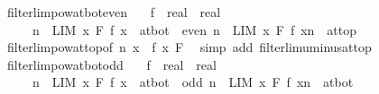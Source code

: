 \begin{isabellebody}
\isamarkupfalse%
%
\endisatagproof
{\isafoldproof}%
%
\isadelimproof
\isanewline
%
\endisadelimproof
\isanewline
{}\isamarkupfalse%
\ filterlim{\isacharunderscore}{\kern0pt}pow{\isacharunderscore}{\kern0pt}at{\isacharunderscore}{\kern0pt}bot{\isacharunderscore}{\kern0pt}even{\isacharcolon}{\kern0pt}\isanewline
\ \ \ f\ {\isacharcolon}{\kern0pt}{\isacharcolon}{\kern0pt}\ {\isachardoublequoteopen}real\ {\isasymRightarrow}\ real{\isachardoublequoteclose}\isanewline
\ \ \ {\isachardoublequoteopen}{}\ {\isacharless}{\kern0pt}\ n\ {\isasymLongrightarrow}\ LIM\ x\ F{\isachardot}{\kern0pt}\ f\ x\ {\isacharcolon}{\kern0pt}{\isachargreater}{\kern0pt}\ at{\isacharunderscore}{\kern0pt}bot\ {\isasymLongrightarrow}\ even\ n\ {\isasymLongrightarrow}\ LIM\ x\ F{\isachardot}{\kern0pt}\ {\isacharparenleft}{\kern0pt}f\ x{\isacharparenright}{\kern0pt}{\isacharcircum}{\kern0pt}n\ {\isacharcolon}{\kern0pt}{\isachargreater}{\kern0pt}\ at{\isacharunderscore}{\kern0pt}top{\isachardoublequoteclose}\isanewline
%
\isadelimproof
\ \ %
\endisadelimproof
%
\isatagproof
{}\isamarkupfalse%
\ filterlim{\isacharunderscore}{\kern0pt}pow{\isacharunderscore}{\kern0pt}at{\isacharunderscore}{\kern0pt}top{\isacharbrackleft}{\kern0pt}of\ n\ {\isachardoublequoteopen}{\isasymlambda}x{\isachardot}{\kern0pt}\ {\isacharminus}{\kern0pt}\ f\ x{\isachardoublequoteclose}\ F{\isacharbrackright}{\kern0pt}\ \isamarkupfalse%
\ {\isacharparenleft}{\kern0pt}simp\ add{\isacharcolon}{\kern0pt}\ filterlim{\isacharunderscore}{\kern0pt}uminus{\isacharunderscore}{\kern0pt}at{\isacharunderscore}{\kern0pt}top{\isacharparenright}{\kern0pt}%
\endisatagproof
{\isafoldproof}%
%
\isadelimproof
\isanewline
%
\endisadelimproof
\isanewline
{}\isamarkupfalse%
\ filterlim{\isacharunderscore}{\kern0pt}pow{\isacharunderscore}{\kern0pt}at{\isacharunderscore}{\kern0pt}bot{\isacharunderscore}{\kern0pt}odd{\isacharcolon}{\kern0pt}\isanewline
\ \ \ f\ {\isacharcolon}{\kern0pt}{\isacharcolon}{\kern0pt}\ {\isachardoublequoteopen}real\ {\isasymRightarrow}\ real{\isachardoublequoteclose}\isanewline
\ \ \ {\isachardoublequoteopen}{}\ {\isacharless}{\kern0pt}\ n\ {\isasymLongrightarrow}\ LIM\ x\ F{\isachardot}{\kern0pt}\ f\ x\ {\isacharcolon}{\kern0pt}{\isachargreater}{\kern0pt}\ at{\isacharunderscore}{\kern0pt}bot\ {\isasymLongrightarrow}\ odd\ n\ {\isasymLongrightarrow}\ LIM\ x\ F{\isachardot}{\kern0pt}\ {\isacharparenleft}{\kern0pt}f\ x{\isacharparenright}{\kern0pt}{\isacharcircum}{\kern0pt}n\ {\isacharcolon}{\kern0pt}{\isachargreater}{\kern0pt}\ at{\isacharunderscore}{\kern0pt}bot{\isachardoublequoteclose}\isanewline

\end{isabellebody}
